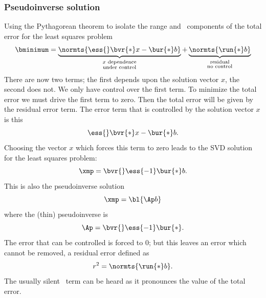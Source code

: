\subsubsection{Pseudoinverse solution}  %
Using the Pythagorean theorem to isolate the range and \ns \ components of the total error for the least squares problem
\begin{equation*}
  \bminimum = \underbrace{\normts{ \ess{} \bvr{*} x -\bur{*} b  }}_{\substack{x \text{ dependence}\\\text{under control}}} + \underbrace{\normts{ \run{*} b  }}_{\substack{\text{residual}\\\text{no control}}}
\end{equation*}
There are now two terms; the first depends upon the solution vector $x$, the second does not. We only have control over the first term. To minimize the total error we must drive the first term to zero. Then the total error will be given by the residual error term.
The error term that is controlled by the solution vector $x$ is this
\begin{equation}
  \ess{} \bvr{*} x - \bur{*} b .
\end{equation}
Choosing the vector $x$ which forces this term to zero  leads to the SVD solution for the least squares problem:
\begin{equation*}
  \xmp = \bvr{} \ess{-1} \bur{*} b.
  \label{eq:svd soln}
\end{equation*}
This is also the pseudoinverse solution
\begin{equation*}
  \xmp = \bl{\Ap b}
\end{equation*}
where the (thin) pseudoinverse is
\begin{equation*}
  \Ap = \bvr{} \ess{-1} \bur{*}.
  \label{eq:mpptsvd}
\end{equation*}
The error that can be controlled is forced to 0; but this leaves an error which cannot be removed, a residual error defined as
  \begin{equation*}   %
    r^{2} = \normts{ \run{*} b  } .
    \label{eq:r2ub}
  \end{equation*}
The usually silent \ns \ term can be heard as it pronounces the value of the total error.


